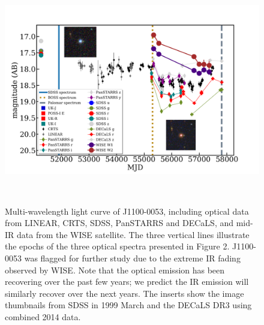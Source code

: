 \documentclass{nature}
\begin{document}
\begin{figure}
  \centering
  \includegraphics[width=16.00cm, height=10.00cm, trim=0.0cm 0.0cm 0.0cm 0.0cm, clip]
  {../plots/lc/J110057_lc_20180113v1.png}
  \caption[]{
    Multi-wavelength light curve of J1100-0053, including optical data from LINEAR, CRTS, SDSS, PanSTARRS and DECaLS, and mid-IR data from the WISE satellite.  The three vertical lines illustrate the epochs of the three optical spectra presented in Figure 2.  J1100-0053 was flagged for further study due to the extreme IR fading observed by WISE.  Note that the optical emission has been recovering over the past few years; we predict the IR emission will similarly recover over the next years. The inserts show the image thumbnails from SDSS in 1999 March and the DECaLS DR3 using combined 2014 data.}
  \label{fig:J110057_LC_CRTS}
\end{figure}
\end{document}
